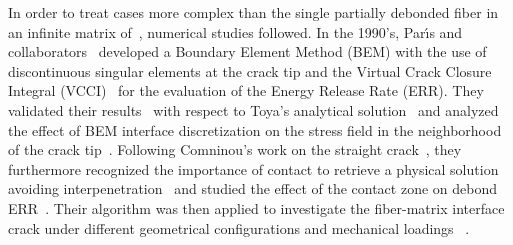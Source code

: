 In order to treat cases more complex than the single partially debonded fiber in an infinite matrix of~\cite{England1966,Perlman1967,Toya1974}, numerical studies followed. In the 1990's, Par{\'{\i}}s and collaborators~\cite{Paris1996} developed a Boundary Element Method (BEM) with the use of discontinuous singular elements at the crack tip and the Virtual Crack Closure Integral (VCCI)~\cite{Irwin1958} for the evaluation of the Energy Release Rate (ERR). They validated their results~\cite{Paris1996} with respect to Toya's analytical solution~\cite{Toya1974} and analyzed the effect of BEM interface discretization on the stress field in the neighborhood of the crack tip~\cite{DelCano1997}. Following Comninou's work on the straight crack~\cite{Comninou1977}, they furthermore recognized the importance of contact to retrieve a physical solution avoiding interpenetration~\cite{Paris1996} and studied the effect of the contact zone on debond ERR~\cite{Varna1997a}. Their algorithm was then applied to investigate the fiber-matrix interface crack under different geometrical configurations and mechanical loadings ~\cite{Paris2007,Correa2007,Correa2011,Correa2013,Correa2014,Sandino2016,Sandino2018}.\\
